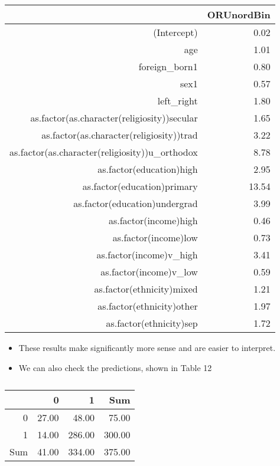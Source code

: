 \documentclass[12pt,letterpaper]{article}
\begin{document}
\begin{table}[ht]
	\centering
	\caption{} 
	\label{} 
	\begin{tabular}{rr}
		\hline
		& ORUnordBin \\ 
		\hline
		(Intercept) & 0.02 \\ 
		age & 1.01 \\ 
		foreign\_born1 & 0.80 \\ 
		sex1 & 0.57 \\ 
		left\_right & 1.80 \\ 
		as.factor(as.character(religiosity))secular & 1.65 \\ 
		as.factor(as.character(religiosity))trad & 3.22 \\ 
		as.factor(as.character(religiosity))u\_orthodox & 8.78 \\ 
		as.factor(education)high & 2.95 \\ 
		as.factor(education)primary & 13.54 \\ 
		as.factor(education)undergrad & 3.99 \\ 
		as.factor(income)high & 0.46 \\ 
		as.factor(income)low & 0.73 \\ 
		as.factor(income)v\_high & 3.41 \\ 
		as.factor(income)v\_low & 0.59 \\ 
		as.factor(ethnicity)mixed & 1.21 \\ 
		as.factor(ethnicity)other & 1.97 \\ 
		as.factor(ethnicity)sep & 1.72 \\ 
		\hline
	\end{tabular}
\end{table}

\newpage
\begin{itemize}
	\item These results make significantly more sense and are easier to interpret. 
	\item We can also check the predictions, shown in Table 12
		
	
\end{itemize}

\newpage

\begin{table}[ht]
	\centering
	\caption{} 
	\label{} 
	\begin{tabular}{rrrr}
		\hline
		& 0 & 1 & Sum \\ 
		\hline
		0 & 27.00 & 48.00 & 75.00 \\ 
		1 & 14.00 & 286.00 & 300.00 \\ 
		Sum & 41.00 & 334.00 & 375.00 \\ 
		\hline
	\end{tabular}
\end{table}
\end{document}
